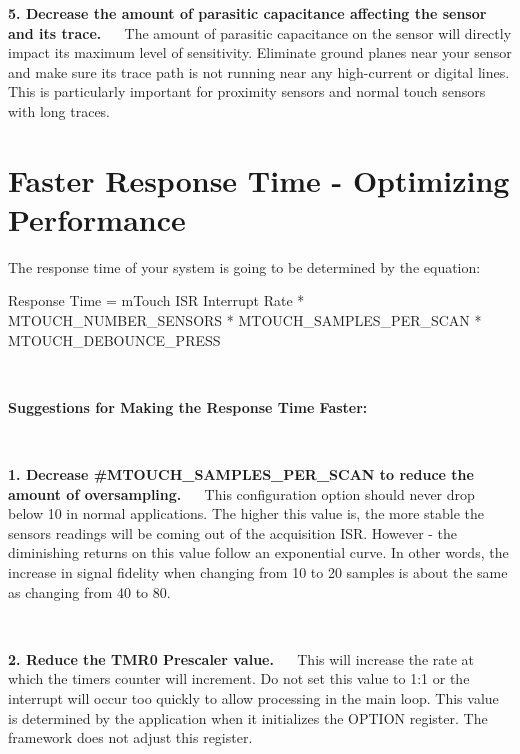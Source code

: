 \begin{DoxyItemize}
\item {\bfseries 5. Decrease the amount of parasitic capacitance affecting the sensor and its trace.}~\newline
~\newline
 The amount of parasitic capacitance on the sensor will directly impact its maximum level of sensitivity. Eliminate ground planes near your sensor and make sure its trace path is not running near any high-\/current or digital lines. This is particularly important for proximity sensors and normal touch sensors with long traces. \end{DoxyItemize}
\hypertarget{ts-ResponseTime}{}\section{Faster Response Time -\/ Optimizing Performance}\label{ts-ResponseTime}
The response time of your system is going to be determined by the equation\+: 
\begin{DoxyCode}
Response Time = mTouch ISR Interrupt Rate * MTOUCH\_NUMBER\_SENSORS * MTOUCH\_SAMPLES\_PER\_SCAN * 
      MTOUCH\_DEBOUNCE\_PRESS
\end{DoxyCode}


~\newline


{\bfseries Suggestions for Making the Response Time Faster\+:}~\newline


~\newline


\begin{DoxyItemize}
\item {\bfseries 1. Decrease \#\+M\+T\+O\+U\+C\+H\+\_\+\+S\+A\+M\+P\+L\+E\+S\+\_\+\+P\+E\+R\+\_\+\+S\+C\+A\+N to reduce the amount of oversampling.}~\newline
~\newline
 This configuration option should never drop below 10 in normal applications. The higher this value is, the more stable the sensor\textquotesingle{}s readings will be coming out of the acquisition I\+S\+R. However -\/ the diminishing returns on this value follow an exponential curve. In other words, the increase in signal fidelity when changing from 10 to 20 samples is about the same as changing from 40 to 80.\end{DoxyItemize}
~\newline


\begin{DoxyItemize}
\item {\bfseries 2. Reduce the T\+M\+R0 Prescaler value.}~\newline
~\newline
 This will increase the rate at which the timer\textquotesingle{}s counter will increment. Do not set this value to 1\+:1 or the interrupt will occur too quickly to allow processing in the main loop. This value is determined by the application when it initializes the O\+P\+T\+I\+O\+N register. The framework does not adjust this register.\end{DoxyItemize}
~\newline


